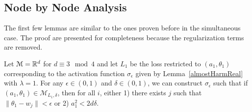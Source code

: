 \subsection{Node by Node Analysis}

The first few lemmas are similar to the ones proven before in the simultaneous case. The proof are presented for completeness because the regularization terms are removed.

\begin{lemma}\label{nodeConv}
Let $\mathcal{M} = {\mathbb{R}}^d$ for $d \equiv 3 \mod 4$ and let $L_1$ be the loss restricted to $(a_1,\theta_1)$ corresponding to the activation function $\sigma_\epsilon$ given by Lemma~\ref{almostHarmReal} with $\lambda = 1$. For any $\epsilon \in (0,1)$ and $\delta \in (0, 1)$, we can construct $\sigma_\epsilon$ such that if ${(a_1,\theta_1)} \in \mathcal{M}_{L_1,\delta}$, then for all $i$, either 1) there exists $j$ such that $\|\theta_1 - w_j\| < \epsilon$ or 2) $a_1^2 < 2d\delta$.
\end{lemma}


